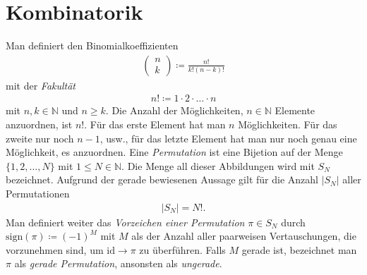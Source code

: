 \documentclass{book}
\newcommand{\sign}{\text{sign}}
\newcommand{\id}{\text{id}}
\begin{document}
\section{Kombinatorik}
\label{sec:kombinatorik}

Man definiert den Binomialkoeffizienten
%
\begin{eqnarray}
\left(\begin{array}{c}
n\\
k
\end{array}\right) \coloneqq \frac{n!}{k!\left(n - k\right)!}
\end{eqnarray}
%
mit der \textit{Fakultät}
%
\begin{eqnarray}
n! \coloneqq 1\cdot 2\cdot\dotsc\cdot n
\end{eqnarray}
%
mit $n, k\in\mathbb{N}$ und $n\geq k$. Die Anzahl der Möglichkeiten, $n\in\mathbb{N}$ Elemente anzuordnen, ist $n!$. Für das erste Element hat man $n$ Möglichkeiten. Für das zweite nur noch $n - 1$, usw., für das letzte Element hat man nur noch genau eine Möglichkeit, es anzuordnen. Eine \textit{Permutation} ist eine Bijetion auf der Menge $\{1, 2, \dotsc, N\}$ mit $1 \leq N \in \mathbb{N}$. Die Menge all dieser Abbildungen wird mit $S_N$ bezeichnet. Aufgrund der gerade bewiesenen Aussage gilt für die Anzahl $\left|S_N\right|$ aller Permutationen
%
\begin{eqnarray}
\left|S_N\right| = N!.
\end{eqnarray}
%
Man definiert weiter das \textit{Vorzeichen einer Permutation} $\pi \in S_N$ durch $\sign\left(\pi\right) \coloneqq \left(-1\right)^M$ mit $M$ als der Anzahl aller paarweisen Vertauschungen, die vorzunehmen sind, um $\id \to \pi$ zu überführen. Falls $M$ gerade ist, bezeichnet man $\pi$ als \textit{gerade Permutation}, ansonsten als \textit{ungerade}.
\end{document}
